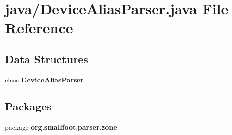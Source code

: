 \section{java/\+Device\+Alias\+Parser.java File Reference}
\label{DeviceAliasParser_8java}
\subsection*{Data Structures}
\begin{DoxyCompactItemize}
\item 
class {\bf Device\+Alias\+Parser}
\end{DoxyCompactItemize}
\subsection*{Packages}
\begin{DoxyCompactItemize}
\item 
package {\bf org.\+smallfoot.\+parser.\+zone}
\end{DoxyCompactItemize}

